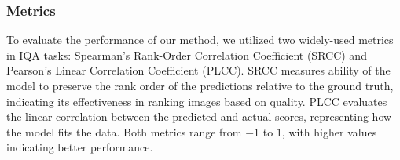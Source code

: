 \subsubsection{Metrics}
To evaluate the performance of our method, we utilized two widely-used metrics in IQA tasks: Spearman's Rank-Order Correlation Coefficient (SRCC) and Pearson's Linear Correlation Coefficient (PLCC).
SRCC measures ability of the model to preserve the rank order of the predictions relative to the ground truth, indicating its effectiveness in ranking images based on quality.
PLCC evaluates the linear correlation between the predicted and actual scores, representing how the model fits the data.
Both metrics range from $-1$ to $1$, with higher values indicating better performance.
